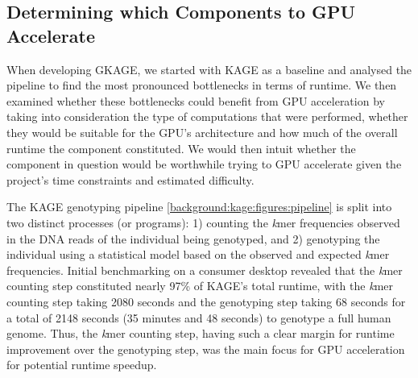 \subsection{Determining which Components to GPU Accelerate} \label{methods:determining_which_components_to_gpu_accelerate}

When developing GKAGE, we started with KAGE as a baseline and analysed the pipeline to find the most pronounced bottlenecks in terms of runtime.
We then examined whether these bottlenecks could benefit from GPU acceleration by taking into consideration the type of computations that were performed, whether they would be suitable for the GPU's architecture and how much of the overall runtime the component constituted. 
We would then intuit whether the component in question would be worthwhile trying to GPU accelerate given the project's time constraints and estimated difficulty.

The KAGE genotyping pipeline \ref{background:kage:figures:pipeline} is split into two distinct processes (or programs): 1) counting the \textit{k}mer frequencies observed in the DNA reads of the individual being genotyped, and 2) genotyping the individual using a statistical model based on the observed and expected \textit{k}mer frequencies.
Initial benchmarking on a consumer desktop revealed that the \textit{k}mer counting step constituted nearly 97\% of KAGE's total runtime, with the \textit{k}mer counting step taking 2080 seconds and the genotyping step taking 68 seconds for a total of 2148 seconds (35 minutes and 48 seconds) to genotype a full human genome.
Thus, the \textit{k}mer counting step, having such a clear margin for runtime improvement over the genotyping step, was the main focus for GPU acceleration for potential runtime speedup.
